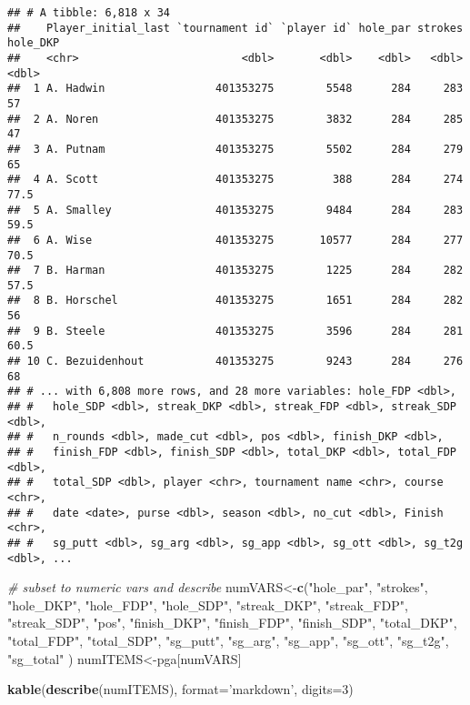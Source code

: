 \documentclass[
]{article}
\newenvironment{Shaded}{\begin{snugshade}}{\end{snugshade}}
\newcommand{\CommentTok}[1]{\textcolor[rgb]{0.56,0.35,0.01}{\textit{#1}}}
\newcommand{\DataTypeTok}[1]{\textcolor[rgb]{0.13,0.29,0.53}{#1}}
\newcommand{\DecValTok}[1]{\textcolor[rgb]{0.00,0.00,0.81}{#1}}
\newcommand{\KeywordTok}[1]{\textcolor[rgb]{0.13,0.29,0.53}{\textbf{#1}}}
\newcommand{\NormalTok}[1]{#1}
\newcommand{\StringTok}[1]{\textcolor[rgb]{0.31,0.60,0.02}{#1}}
\begin{document}
\begin{verbatim}
## # A tibble: 6,818 x 34
##    Player_initial_last `tournament id` `player id` hole_par strokes hole_DKP
##    <chr>                         <dbl>       <dbl>    <dbl>   <dbl>    <dbl>
##  1 A. Hadwin                 401353275        5548      284     283     57  
##  2 A. Noren                  401353275        3832      284     285     47  
##  3 A. Putnam                 401353275        5502      284     279     65  
##  4 A. Scott                  401353275         388      284     274     77.5
##  5 A. Smalley                401353275        9484      284     283     59.5
##  6 A. Wise                   401353275       10577      284     277     70.5
##  7 B. Harman                 401353275        1225      284     282     57.5
##  8 B. Horschel               401353275        1651      284     282     56  
##  9 B. Steele                 401353275        3596      284     281     60.5
## 10 C. Bezuidenhout           401353275        9243      284     276     68  
## # ... with 6,808 more rows, and 28 more variables: hole_FDP <dbl>,
## #   hole_SDP <dbl>, streak_DKP <dbl>, streak_FDP <dbl>, streak_SDP <dbl>,
## #   n_rounds <dbl>, made_cut <dbl>, pos <dbl>, finish_DKP <dbl>,
## #   finish_FDP <dbl>, finish_SDP <dbl>, total_DKP <dbl>, total_FDP <dbl>,
## #   total_SDP <dbl>, player <chr>, tournament name <chr>, course <chr>,
## #   date <date>, purse <dbl>, season <dbl>, no_cut <dbl>, Finish <chr>,
## #   sg_putt <dbl>, sg_arg <dbl>, sg_app <dbl>, sg_ott <dbl>, sg_t2g <dbl>, ...
\end{verbatim}

\begin{Shaded}
\begin{Highlighting}[]
\CommentTok{# subset to numeric vars and describe}
\NormalTok{numVARS<-}\KeywordTok{c}\NormalTok{(}\StringTok{"hole_par"}\NormalTok{,}
          \StringTok{"strokes"}\NormalTok{,}
          \StringTok{"hole_DKP"}\NormalTok{,}
          \StringTok{"hole_FDP"}\NormalTok{,}
          \StringTok{"hole_SDP"}\NormalTok{,}
          \StringTok{"streak_DKP"}\NormalTok{,}
          \StringTok{"streak_FDP"}\NormalTok{,}
          \StringTok{"streak_SDP"}\NormalTok{,}
          \StringTok{"pos"}\NormalTok{,}
          \StringTok{"finish_DKP"}\NormalTok{,}
          \StringTok{"finish_FDP"}\NormalTok{,}
          \StringTok{"finish_SDP"}\NormalTok{,}
          \StringTok{"total_DKP"}\NormalTok{,}
          \StringTok{"total_FDP"}\NormalTok{,}
          \StringTok{"total_SDP"}\NormalTok{,}
          \StringTok{"sg_putt"}\NormalTok{,}
          \StringTok{"sg_arg"}\NormalTok{,}
          \StringTok{"sg_app"}\NormalTok{,}
          \StringTok{"sg_ott"}\NormalTok{,}
          \StringTok{"sg_t2g"}\NormalTok{,}
          \StringTok{"sg_total"}
\NormalTok{)}
\NormalTok{numITEMS<-pga[numVARS]}

\KeywordTok{kable}\NormalTok{(}\KeywordTok{describe}\NormalTok{(numITEMS), }
      \DataTypeTok{format=}\StringTok{'markdown'}\NormalTok{, }
      \DataTypeTok{digits=}\DecValTok{3}\NormalTok{)}
\end{Highlighting}
\end{Shaded}
\end{document}
